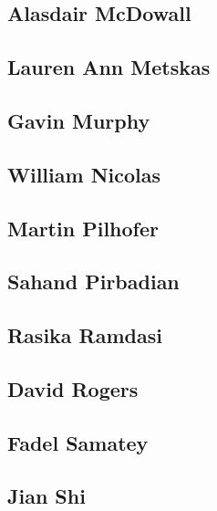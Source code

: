 \documentclass[]{tufte-book}
\begin{document}
\hypertarget{alasdair_mcdowall}{\subsection{Alasdair
McDowall}\label{alasdair_mcdowall}}

\hypertarget{lauren_ann_metskas}{\subsection{Lauren Ann
Metskas}\label{lauren_ann_metskas}}

\hypertarget{gavin_murphy}{\subsection{Gavin
Murphy}\label{gavin_murphy}}

\hypertarget{william_nicolas}{\subsection{William
Nicolas}\label{william_nicolas}}

\hypertarget{martin_pilhofer}{\subsection{Martin
Pilhofer}\label{martin_pilhofer}}

\hypertarget{sahand_pirbadian}{\subsection{Sahand
Pirbadian}\label{sahand_pirbadian}}

\hypertarget{rasika_ramdasi}{\subsection{Rasika
Ramdasi}\label{rasika_ramdasi}}

\hypertarget{david_rogers}{\subsection{David
Rogers}\label{david_rogers}}

\hypertarget{fadel_samatey}{\subsection{Fadel
Samatey}\label{fadel_samatey}}

\hypertarget{jian_shi}{\subsection{Jian Shi}\label{jian_shi}}
\end{document}
